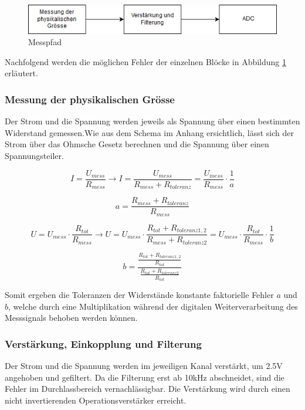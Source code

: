 \begin{figure}[htb]
	\includegraphics[width=160mm]{images/Analoge_Schaltung_genauigkeit.png}
	\caption{Messpfad} %
	\label{fig:genauigkeit}
\end{figure}

Nachfolgend werden die möglichen Fehler der einzelnen Blöcke in Abbildung \ref{fig:genauigkeit} erläutert.

\subsubsection*{Messung der physikalischen Grösse}
Der Strom und die Spannung werden jeweils als Spannung über einen bestimmten Widerstand gemessen.Wie aus dem Schema im Anhang ersichtlich, lässt sich der Strom über das Ohmsche Gesetz berechnen und die Spannung über einen Spannungsteiler. 

\begin{equation}
I = \frac{U_{mess}}{R_{mess}} \to I = \frac{U_{mess}}{R_{mess} + R_{toleranz}} = \frac{U_{mess}}{R_{mess}} \cdot \frac{1}{a}
\end{equation}

\[a = \frac{R_{mess} + R_{toleranz}}{R_{mess}}\]

\begin{equation}
U = U_{mess} \cdot \frac{R_{tot}}{R_{mess}} \to U = U_{mess} \cdot \frac{R_{tot} + R_{toleranz1,2}}{R_{mess}+R_{toleranz2}} = U_{mess} \cdot \frac{R_{tot}}{R_{mess}} \cdot \frac{1}{b}
\end{equation}

\[b = \frac{\frac{R_{tot} + R_{toleranz1,2}}{R_{tot}}}{\frac{R_{tot} + R_{toleranz2}}{R_{tot}}}\]

Somit ergeben die Toleranzen der Widerstände konstante faktorielle Fehler $a$ und $b$, welche durch eine Multiplikation während der digitalen Weiterverarbeitung des Messsignals behoben werden können.





\subsubsection*{Verstärkung, Einkopplung und Filterung}
Der Strom und die Spannung werden im jeweiligen Kanal verstärkt, um 2.5V angehoben und gefiltert. Da die Filterung erst ab 10kHz abschneidet, sind die Fehler im Durchlassbereich vernachlässigbar. Die Verstärkung wird durch einen nicht invertierenden Operationsverstärker erreicht.

